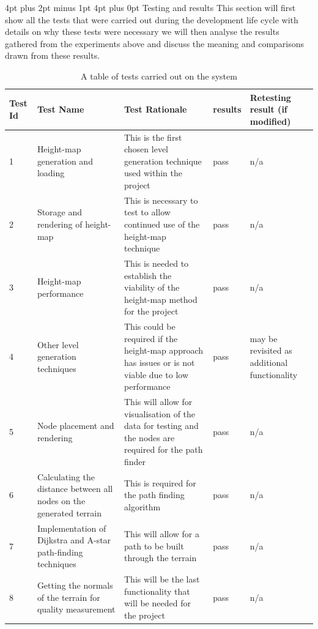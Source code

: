 \documentclass[12pt,a4paper]{article}
\makeatletter
\renewcommand\section{\@startsection {section}{1}{0mm} %
                               {4pt plus 2pt minus 1pt} %
                               {4pt plus 0pt} %
                               {\bfseries}}
\makeatother
\begin{document}
\section{Testing and results}
This section will first show all the tests that were carried out during the development life cycle with details on why these tests were necessary we will then analyse the results gathered from the experiments above and discuss the meaning and comparisons drawn from these results.  
\begin{table}[h!]
\begin{tabular}{|p{0.8cm}|p{2cm}|p{5cm}|p{1.4cm}|p{2cm}|}
\hline
Test Id & Test Name & Test Rationale & results & Retesting result (if modified) \\
\hline
1 & Height-map generation and loading & This is the first chosen level generation technique used within the project & pass & n/a\\
\hline
2 & Storage and rendering of height-map & This is necessary to test to allow continued use of the height-map technique & pass & n/a\\
\hline
3 & Height-map performance & This is needed to establish the viability of the height-map method for the project & pass & n/a\\ 
\hline
4 & Other level generation techniques & This could be required if the height-map approach has issues or is not viable due to low performance & pass & may be revisited as additional functionality\\
\hline
5 & Node placement and rendering & This will allow for visualisation of the data for testing and the nodes are required for the path finder & pass & n/a\\ 
\hline
6 & Calculating the distance between all nodes on the generated terrain  & This is required for the path finding algorithm & pass & n/a\\
\hline
7 & Implementation of Dijkstra and A-star path-finding techniques &This will allow for a path to be built through the terrain & pass & n/a\\
\hline
8 & Getting the normals of the terrain for quality measurement& This will be the last functionality that will be needed for the project & pass & n/a\\
\hline
  
\end{tabular} 
\caption{A table of tests carried out on the system}
\end{table}
\newpage
\end{document}
